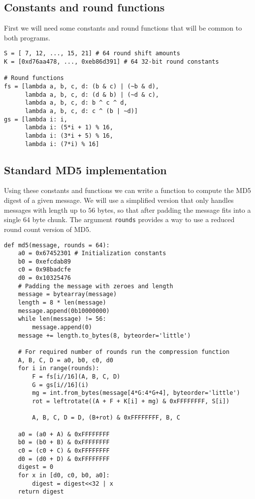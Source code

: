 \subsection{Constants and round functions}
First we will need some constants and round functions that will be common to both programs.
\begin{verbatim}
S = [ 7, 12, ..., 15, 21] # 64 round shift amounts
K = [0xd76aa478, ..., 0xeb86d391] # 64 32-bit round constants

# Round functions
fs = [lambda a, b, c, d: (b & c) | (~b & d),
      lambda a, b, c, d: (d & b) | (~d & c),
      lambda a, b, c, d: b ^ c ^ d,
      lambda a, b, c, d: c ^ (b | ~d)]
gs = [lambda i: i,
      lambda i: (5*i + 1) % 16,
      lambda i: (3*i + 5) % 16,
      lambda i: (7*i) % 16]
\end{verbatim}

\subsection{Standard MD5 implementation}
Using these constants and functions we can write a function to compute the MD5 digest of a given message.
We will use a simplified version that only handles messages with length up to $56$ bytes, so that after padding the message fits into a single $64$ byte chunk.
The argument \texttt{rounds} provides a way to use a reduced round count version of MD5.
\begin{verbatim}
def md5(message, rounds = 64):
    a0 = 0x67452301 # Initialization constants
    b0 = 0xefcdab89
    c0 = 0x98badcfe
    d0 = 0x10325476
    # Padding the message with zeroes and length
    message = bytearray(message)
    length = 8 * len(message)
    message.append(0b10000000)
    while len(message) != 56:
        message.append(0)
    message += length.to_bytes(8, byteorder='little')

    # For required number of rounds run the compression function
    A, B, C, D = a0, b0, c0, d0
    for i in range(rounds):
        F = fs[i//16](A, B, C, D)
        G = gs[i//16](i)
        mg = int.from_bytes(message[4*G:4*G+4], byteorder='little')
        rot = leftrotate((A + F + K[i] + mg) & 0xFFFFFFFF, S[i])

        A, B, C, D = D, (B+rot) & 0xFFFFFFFF, B, C

    a0 = (a0 + A) & 0xFFFFFFFF
    b0 = (b0 + B) & 0xFFFFFFFF
    c0 = (c0 + C) & 0xFFFFFFFF
    d0 = (d0 + D) & 0xFFFFFFFF
    digest = 0
    for x in [d0, c0, b0, a0]:
        digest = digest<<32 | x
    return digest
\end{verbatim}

